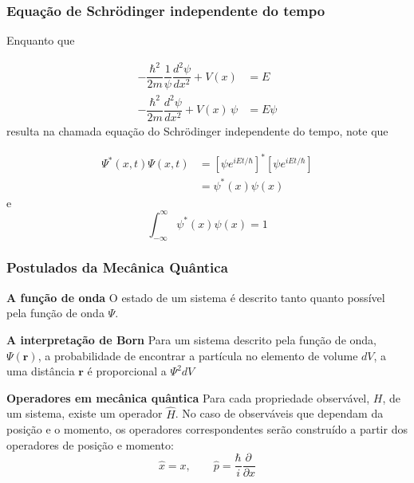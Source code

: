 \documentclass[12pt,brazil]{beamer}
\begin{document}

\begin{frame}
  \frametitle{Equação de Schrödinger independente do tempo}
  \fontsize{11pt}{11pt}\selectfont
  
  Enquanto que
  
    \[
      \begin{align*}
        -\dfrac{\hbar^2}{2m}\dfrac{1}{\psi}\dfrac{d^2\psi}{dx^2} +V(x)&= E\\
        -\dfrac{\hbar^2}{2m}\dfrac{d^2\psi}{dx^2} +V(x)\,\psi&= E\psi
      \end{align*}
    \]
     resulta na chamada equação do Schrödinger independente do tempo, note que
     
    \[
      \begin{align*}
        \Psi^*(x,t)\Psi(x,t) &= \left[\psi e^{iEt/\hbar}\right]^*\left[\psi e^{iEt/\hbar}\right]\\
        &=\psi^*(x)\psi(x)
      \end{align*}      
    \]
    e
    \[
     \int_{-\infty}^\infty \psi^*(x)\psi(x) = 1
    \]

  
\end{frame}


\begin{frame}
  \frametitle{Postulados da Mecânica Quântica}
  \fontsize{10pt}{11pt}\selectfont

  \textbf{A função de onda}\newline
    O estado de um sistema é descrito tanto quanto possível pela função de onda $\Psi$. \newline
  
  \textbf{A interpretação de Born}\newline
    Para um sistema descrito pela função de onda, $\Psi(\mathbf{r})$, a probabilidade de encontrar a partícula no elemento de volume $dV$, a uma distância $\mathbf{r}$ é proporcional a $\Psi^2 dV$
   \newline
  
  \textbf{Operadores em mecânica quântica}\newline
    Para cada propriedade observável, $H$, de um sistema, existe um operador $\hat{H}$. No caso de observáveis que dependam da posição e o momento, os operadores correspondentes serão construído a partir dos operadores de posição e momento:
    \[
     \hat{x} = x,\qquad \hat{p}=\dfrac{\hbar}{i}\dfrac{\partial\,}{\partial x}
    \]

  
\end{frame}
\end{document}
